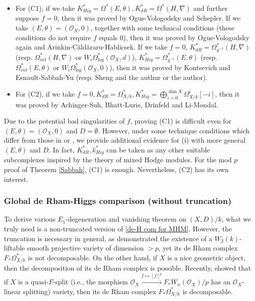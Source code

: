 \documentclass[12pt, a4paper]{article}
\begin{document}
\begin{itemize}
    \item For (C1), if we take $K_{Hig}^*=\Omega^*(E,\theta), K_{dR}^*=\Omega^*(H,\nabla)$ and further suppose $f=0$, then it was proved by Ogus-Vologodsky\cite{OV} and Schepler\cite{Schepler}. If  we take $(E,\theta)=(\mathcal O_X,0)$, together with some technical conditions (these conditions do not require $f$ equals $0$), then it was proved by Ogus-Vologodsky\cite{OV} again and Arinkin-C\u{a}ld\u{a}raru-Hablicsek\cite{ACH}. If we take $f=0$, $K^*_{dR}=\Omega^*_{g^{-1}}(H,\nabla)$ (resp. $\Omega^*_{int}(H,\nabla)$ or $W_i\Omega^*_{\log}(\mathcal O_X,d)$), $K^*_{Hig}=\Omega^*_{g^{-1}}(E,\theta)$ (resp. $\Omega^*_{int}(E,\theta)$ or $W_i\Omega^*_{\log}(\mathcal O_X,0)$), then it was proved by Kontsevich and Esnault-Sabbah-Yu\cite{ESY} (resp. Sheng and the authur \cite{SZ2} or the author\cite{Z}).
    \item For (C2), if we take $f=0, K^*_{dR}=\Omega^*_{X/k}, K^*_{Hig}=\bigoplus_{i=0}^{\dim X}\Omega^i_{X/k}[-i]$, then it was proved by Achinger-Suh\cite{AS}, Bhatt-Lurie\cite{BL}, Drinfeld and Li-Mondal\cite{LM}.
\end{itemize}

Due to the potential bad singularities of $f$, proving (C1) is difficult even for $(E,\theta)=(\mathcal O_X,0)$ and $D=\emptyset$.  However, under some technique conditions which differ from those in \cite{OV} or \cite{ACH}, we provide additional evidence for (i) with more general $(E,\theta)$ and $D$.
In fact, $K_{dR}^*,k_{Hig}^*$ can be taken as any other suitable subcomplexes inspired by the theory of mixed Hodge modules. For the mod $p$ proof of Theorem \ref{Sabbah}, (C1) is enough. Nevertheless, (C2) has its own interest. 
\fi

\iffalse
\subsubsection{Global de Rham-Higgs comparison (without truncation)}
To derive various $E_1$-degeneration and vanishing theorem on $(X,D)/k$, what we truly need is a non-truncated version of \eqref{de-H com for MHM}. However, the truncation is necessary in general, as \cite[Corollary 10.7]{P1} demonstrated  the existence of a $W_2(k)$-liftable smooth projective variety of dimension $>p$, yet its de Rham complex $F_*\Omega^*_{X/k}$ is not decomposable. On the other hand, if $X$ is a nice geometric object, then the decomposition of its de Rham complex is possible. Recently, \cite[Corollaries 4.6, 4.10]{P2} showed that if $X$ is a quasi-$F$-split (i.e., the morphism $\mathcal O_X\xrightarrow{f\mapsto[f]^p}F_*W_n(\mathcal O_X)/p$ has an $\mathcal O_X$-linear splitting) variety, then its de Rham complex $F_*\Omega^*_{X/k}$ is decomposable.
\end{document}

